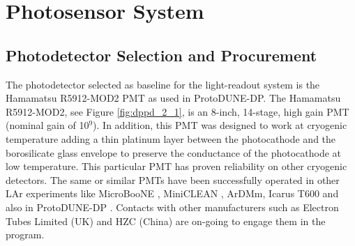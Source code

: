
\section{Photosensor System}
\label{sec:fddp-pd-2}

\subsection{Photodetector Selection and Procurement}
\label{sec:fddp-pd-2.1}

The photodetector selected as baseline for the light-readout system is the Hamamatsu R5912-MOD2 PMT as used in ProtoDUNE-DP. The Hamamatsu R5912-MOD2, see Figure \ref{fig:dppd_2_1}, is an 8-inch, 14-stage, high gain PMT (nominal gain of 10$^9$). In addition, this PMT was designed to work at cryogenic temperature adding a thin platinum layer between the photocathode and the borosilicate glass envelope to preserve the conductance of the photocathode at low temperature. This particular PMT has proven reliability on other cryogenic detectors. The same or similar PMTs have been successfully operated in other LAr experiments like MicroBooNE \cite{microboone}, MiniCLEAN \cite{miniclean}, ArDMm, Icarus T600 \cite{icarus} and also in ProtoDUNE-DP \cite{protoDUNDP-tdr}. Contacts with other manufacturers such as Electron Tubes Limited (UK) \cite{electrontubeslim} and HZC (China) \cite{hzc} are on-going to engage them in the program.

